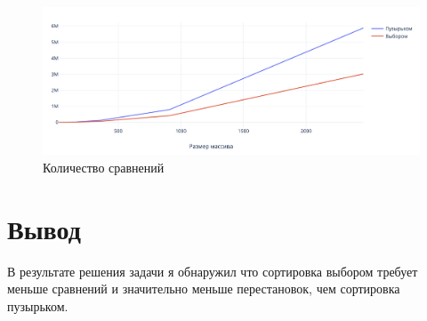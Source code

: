 \documentclass[a4paper,14pt,russian]{report}
\begin{document}
\begin{figure}[!htb]
\centerline{\includegraphics[width=1\textwidth]{comparisons}}
\caption{Количество сравнений}
\end{figure}

\section{Вывод}

В результате решения задачи я обнаружил что сортировка выбором требует меньше сравнений и значительно меньше перестановок, чем сортировка пузырьком.
\end{document}
